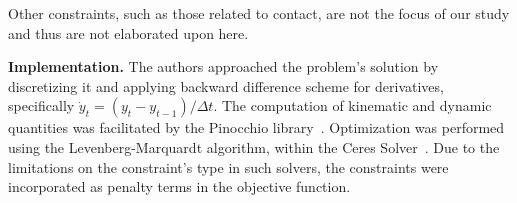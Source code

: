Other constraints, such as those related to contact, are not the focus of our study and thus are not elaborated upon here.

\noindent\textbf{Implementation.} The authors approached the problem's solution by discretizing it and applying backward difference scheme 
for derivatives, specifically \(\dot{y}_t = (y_t - y_{t - 1}) / \Delta t\). The computation of kinematic and dynamic quantities was facilitated 
by the Pinocchio library~\cite{carpentier2019pinocchio}. Optimization was performed using the Levenberg-Marquardt algorithm, within the Ceres 
Solver~\cite{Agarwal_Ceres_Solver_2022}. Due to the limitations on the constraint's type in such solvers, the constraints were incorporated as 
penalty terms in the objective function.